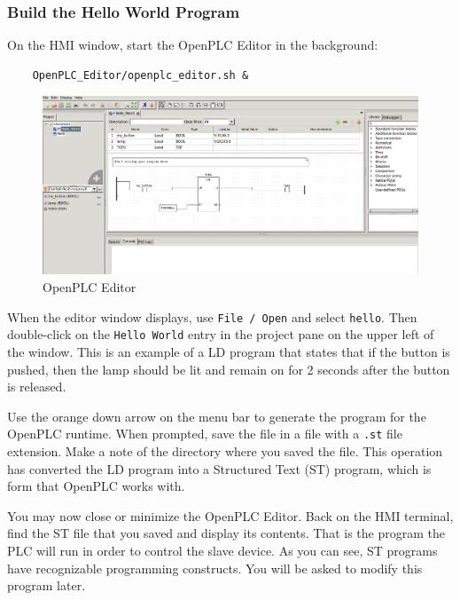\subsubsection{Build the Hello World Program}
On the HMI window, start the OpenPLC Editor in the background:
\begin{verbatim}
    OpenPLC_Editor/openplc_editor.sh &
\end{verbatim}
\begin{figure}[H]
\begin{center}
\includegraphics [width=0.8\linewidth]{openplcEditor.png}
\end{center}
\caption{OpenPLC Editor}
\label{fig:editor}
\end{figure}

When the editor window displays, use {\tt File / Open} and select {\tt hello}.  Then double-click on the
{\tt Hello World} entry in the project pane on the upper left of the window.  This is an example of a LD program that 
states that if the button is pushed, then the lamp should be lit and remain on for 2 seconds after the button is
released.  

Use the orange down arrow on the menu bar to generate the program for the OpenPLC runtime.  When prompted, save the 
file in a file with a {\tt .st} file extension.  Make a note of the directory where you saved the file.  This operation
has converted the LD program into a Structured Text (ST) program, which is form that OpenPLC works with.

You may now close or minimize the OpenPLC Editor.  Back on the HMI terminal, find the ST file that you saved 
and display its contents.  That is the program the PLC will run in order to control the slave device.  As you can see,
ST programs have recognizable programming constructs.  You will be asked to modify this program later.

